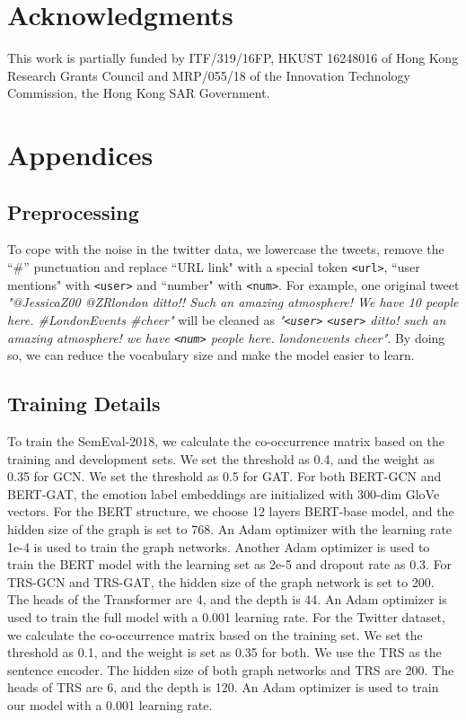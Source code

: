 \documentclass[11pt,a4paper]{article}
\begin{document}
\section*{Acknowledgments}
This work is partially funded by ITF/319/16FP, HKUST 16248016 of Hong
Kong Research Grants Council and MRP/055/18 of the Innovation Technology Commission, the Hong Kong SAR Government.
 





\clearpage

\appendix

\section{Appendices}
\label{sec:appendix}
\subsection{Preprocessing}

To cope with the noise in the twitter data, we lowercase the tweets, remove the ``\#'' punctuation and replace  ``URL link" with a special token \texttt{<url>}, ``user mentions" with \texttt{<user>} and ``number" with \texttt{<num>}. For example, one original tweet \textit{"@JessicaZ00 @ZRlondon ditto!! Such an amazing atmosphere! We have 10 people here. \#LondonEvents \#cheer"} will be cleaned as \textit{"\texttt{<user>} \texttt{<user>} ditto! such an amazing atmosphere! we have \texttt{<num>} people here. londonevents cheer"}. By doing so, we can reduce the vocabulary size and make the model easier to learn.

\label{sec:supplemental}
\subsection{Training Details}
To train the SemEval-2018, we calculate the co-occurrence matrix  based on the training and development sets. We set the threshold  as 0.4, and the weight  as 0.35 for GCN. We set the threshold  as 0.5 for GAT. For both BERT-GCN and BERT-GAT, the emotion label embeddings are initialized with 300-dim GloVe vectors. For the BERT structure, we choose 12 layers BERT-base model, and the hidden size of the graph is set to 768. An Adam optimizer with the learning rate 1e-4 is used to train the graph networks. Another Adam optimizer is used to train the BERT model with the learning set as 2e-5 and dropout rate as 0.3. For TRS-GCN and TRS-GAT, the hidden size of the graph network is set to 200. The heads of the Transformer are 4, and the depth is 44. An Adam optimizer is used to train the full model with a 0.001 learning rate.  For the Twitter dataset, we calculate the co-occurrence matrix  based on the training set. We set the threshold  as 0.1, and the weight  is set as 0.35 for both. We use the TRS as the sentence encoder. The hidden size of both graph networks and TRS are 200. The heads of TRS are 6, and the depth is 120. An Adam optimizer is used to train our model with a 0.001 learning rate.
\end{document}
